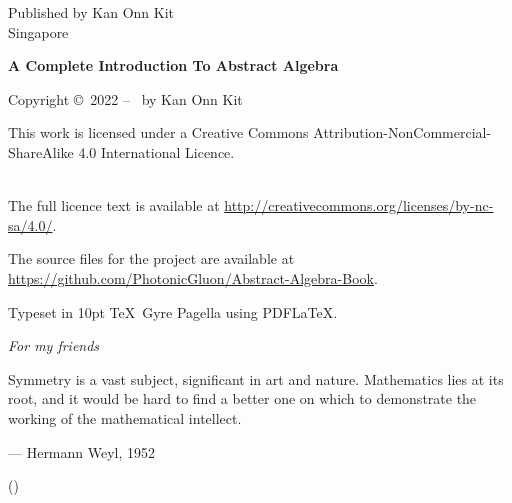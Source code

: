 \newpage{}

\clearpage\null\vfill
\thispagestyle{empty}
\begin{minipage}[b]{0.9\textwidth}
    \footnotesize\raggedright
    \setlength{\parskip}{0.5\baselineskip}

    Published by Kan Onn Kit\\
    Singapore
    \vspace{5cm}

    \textbf{A Complete Introduction To Abstract Algebra}\par
    \editiontext
    \vspace{0.3cm}

    Copyright \copyright \ 2022 -- \the\year\ by Kan Onn Kit\par
    This work is licensed under a
    Creative Commons Attribution-NonCommercial-ShareAlike 4.0 International Licence.\par
    \\
    The full licence text is available at \url{http://creativecommons.org/licenses/by-nc-sa/4.0/}.\par
    The source files for the project are available at \url{https://github.com/PhotonicGluon/Abstract-Algebra-Book}.
    \vspace{0.3cm}

    Typeset in 10pt \TeX~Gyre Pagella using PDF\LaTeX.
\end{minipage}

\vspace*{2\baselineskip}
\cleardoublepage

\thispagestyle{empty}
\vspace*{1cm}

\begin{center}
    {\fontsize{18pt}{0}\selectfont \textit{For my friends}}\\
\end{center}

\vspace*{1.5cm}

\begin{center}
    \Large{\parbox{10cm}{
        \begin{raggedright}
            \Large
            Symmetry is a vast subject, significant in art and nature. Mathematics lies at its root, and it would be hard to find a better one on which to demonstrate the working of the mathematical intellect.
            \vspace{0.3cm}

            \hfill
            --- Hermann Weyl, 1952\\
            \vspace{-0.25cm}

            \hfill
            \normalsize
            ({\cite[p.~145]{weyl_1952}})
        \end{raggedright}
    }
}
\end{center}

